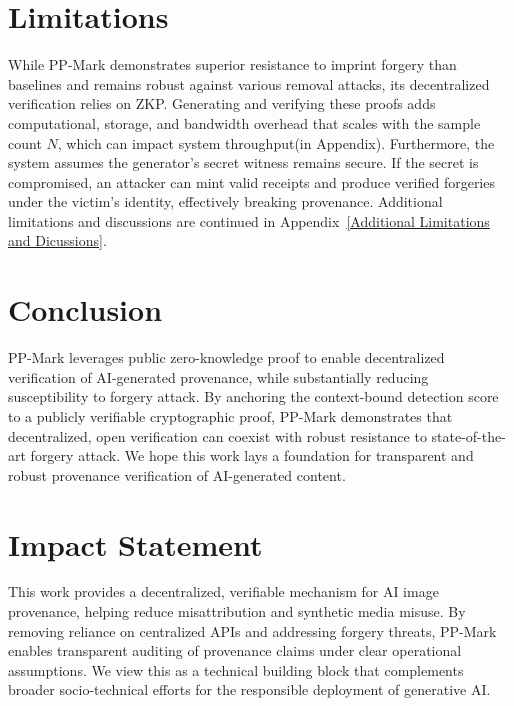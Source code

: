 \documentclass{article}
\theoremstyle{plain}
\theoremstyle{definition}
\theoremstyle{remark}
\begin{document}
\section{Limitations} 
While PP-Mark demonstrates superior resistance to imprint forgery than baselines and remains robust against various removal attacks, its decentralized verification relies on ZKP. Generating and verifying these proofs adds computational, storage, and bandwidth overhead that scales with the sample count $N$, which can impact system throughput(in Appendix). Furthermore, the system assumes the generator’s secret witness remains secure. If the secret is compromised, an attacker can mint valid receipts and produce verified forgeries under the victim’s identity, effectively breaking provenance. Additional limitations and discussions are continued in Appendix~\ref{Additional Limitations and Dicussions}.

\section{Conclusion}
PP-Mark leverages public zero-knowledge proof to enable decentralized verification of AI-generated provenance, while substantially reducing susceptibility to forgery attack. By anchoring the context-bound detection score to a publicly verifiable cryptographic proof, PP-Mark demonstrates that decentralized, open verification can coexist with robust resistance to state-of-the-art forgery attack. We hope this work lays a foundation for transparent and robust provenance verification of AI-generated content.

\section*{Impact Statement}
This work provides a decentralized, verifiable mechanism for AI image provenance, helping reduce misattribution and synthetic media misuse. By removing reliance on centralized APIs and addressing forgery threats, PP-Mark enables transparent auditing of provenance claims under clear operational assumptions. We view this as a technical building block that complements broader socio-technical efforts for the responsible deployment of generative AI.


\nocite{langley00}



\end{document}

